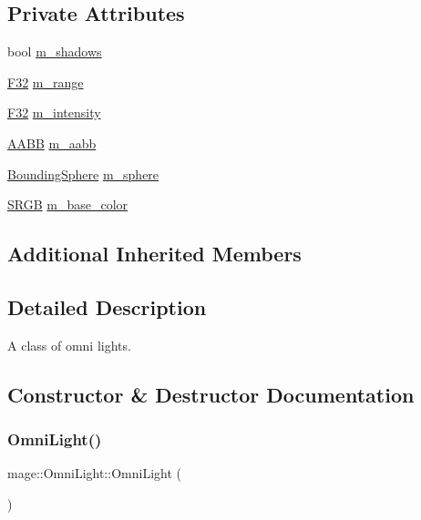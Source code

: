\subsection*{Private Attributes}
\begin{DoxyCompactItemize}
\item 
bool \hyperlink{classmage_1_1_omni_light_a63e5dab12be5021815e98c81dd9aed6a}{m\+\_\+shadows}
\item 
\hyperlink{namespacemage_aa97e833b45f06d60a0a9c4fc22ae02c0}{F32} \hyperlink{classmage_1_1_omni_light_a0427a9c7f90750c645cd67ef0bafce47}{m\+\_\+range}
\item 
\hyperlink{namespacemage_aa97e833b45f06d60a0a9c4fc22ae02c0}{F32} \hyperlink{classmage_1_1_omni_light_aa0cbdebabf3ce0d8bbaeff7cf88cadd0}{m\+\_\+intensity}
\item 
\hyperlink{classmage_1_1_a_a_b_b}{A\+A\+BB} \hyperlink{classmage_1_1_omni_light_a9563f91a80b35fd4f9a7f73721457a8a}{m\+\_\+aabb}
\item 
\hyperlink{classmage_1_1_bounding_sphere}{Bounding\+Sphere} \hyperlink{classmage_1_1_omni_light_a2588b65552978e3641f49f35dca381de}{m\+\_\+sphere}
\item 
\hyperlink{structmage_1_1_s_r_g_b}{S\+R\+GB} \hyperlink{classmage_1_1_omni_light_ae48ee8d67341912519d793ec76269ab3}{m\+\_\+base\+\_\+color}
\end{DoxyCompactItemize}
\subsection*{Additional Inherited Members}


\subsection{Detailed Description}
A class of omni lights. 

\subsection{Constructor \& Destructor Documentation}
\hypertarget{classmage_1_1_omni_light_a7e415936a810268d874f198aa2a9e5d9}{}\label{classmage_1_1_omni_light_a7e415936a810268d874f198aa2a9e5d9} 
\subsubsection{\texorpdfstring{Omni\+Light()}{OmniLight()}\hspace{0.1cm}{\footnotesize\ttfamily [1/3]}}
{\footnotesize\ttfamily mage\+::\+Omni\+Light\+::\+Omni\+Light (\begin{DoxyParamCaption}{ }\end{DoxyParamCaption})\hspace{0.3cm}{\ttfamily [noexcept]}}


